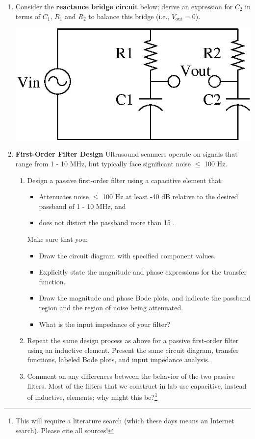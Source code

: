 \begin{enumerate}
\item Consider the {\bf reactance bridge circuit} below; derive an expression for
$C_2$ in terms of $C_1$, $R_1$ and $R_2$ to balance this bridge (i.e.,
$V_\textrm{out} = 0$).

\begin{center}
\includegraphics{reactance_bridge.eps}
\end{center}

\item {\bf First-Order Filter Design} Ultrasound scanners operate on
signals that range from 1 - 10 MHz, but typically face significant noise $\leq$
100 Hz.

\begin{enumerate}
\item Design a passive first-order filter using a capacitive element that:
\begin{itemize}
    \item Attenuates noise $\leq$ 100 Hz at least -40 dB relative to the desired passband of 1 - 10 MHz, and
    \item does not distort the passband more than 15$^\circ$.
\end{itemize}

Make sure that you:
\begin{itemize}
    \item Draw the circuit diagram with specified component values.
    \item Explicitly state the magnitude and phase expressions for the transfer function.
    \item Draw the magnitude and phase Bode plots, and indicate the passband region and the region of noise being attenuated.
    \item What is the input impedance of your filter?
\end{itemize}
\item Repeat the same design process as above for a passive first-order filter using an inductive element.  Present the same circuit diagram, transfer functions, labeled Bode plots, and input impedance analysis. 
\item Comment on any differences between the behavior of the two passive
filters.  Most of the filters that we construct in lab use capacitive, instead
of inductive, elements; why might this be?\footnote{ This will
require a literature search (which these days means an Internet search).  Please cite all sources!}
\end{enumerate}


\end{enumerate}
